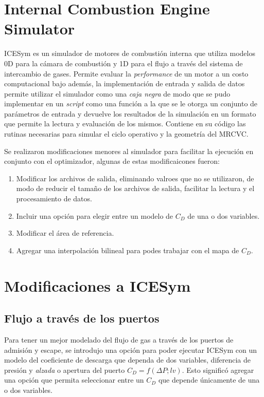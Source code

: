 \section{Internal Combustion Engine Simulator}
%
ICESym es un simulador de motores de combustión interna que  utiliza modelos 0D
para la cámara de combustión y 1D para el flujo a través del sistema de
intercambio de gases.
%
Permite evaluar la \emph{performance} de un motor a un costo computacional bajo
además, la implementación de entrada y salida de datos permite utilizar el
simulador como una \emph{caja negra} de modo que se pudo implementar en un
\emph{script} como una función a la que se le otorga un conjunto de parámetros
de entrada y devuelve los resultados de la simulación en un formato que permite
la lectura y evaluación de los mismos.
%
Contiene en su código las rutinas necesarias para simular el ciclo operativo y la
geometría del MRCVC.

Se realizaron modificaciones menores al simulador para facilitar la ejecución en
conjunto con el optimizador, algunas de estas modificaicones fueron:
%
\begin{enumerate}
    \item Modificar los archivos de salida, eliminando valroes que no se
utilizaron, de modo de reducir el tamaño de los archivos de salida, facilitar la
lectura y el procesamiento de datos.
    \item Incluir una opción para elegir entre un modelo de $C_D$ de una o dos
variables.
    \item Modificar el área de referencia.
    \item Agregar una interpolación bilineal para podes trabajar con el mapa de
$C_D$.
\end{enumerate}


\section{Modificaciones a ICESym}
\subsection{Flujo a través de los puertos}
%
Para tener un mejor modelado del flujo de gas a través de los puertos de
admisión y escape, se introdujo una opción para poder ejecutar ICESym con un
modelo del coeficiente de descarga que dependa de dos variables, diferencia de
presión y \emph{alzada} o apertura del puerto $C_D = f(\Delta P; lv)$.
%
Esto significó agregar una opción que permita seleccionar entre un $C_D$ que
depende únicamente de una o dos variables.

